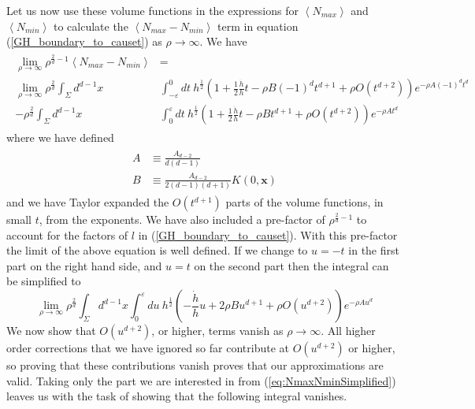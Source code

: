 \documentclass[12pt]{article}
\newcommand{\be}{\begin{equation}}
\newcommand{\ee}{\end{equation}}
\begin{document}
Let us now use these volume functions in the expressions for $\left\langle N_{max}\right\rangle$ and $\left\langle N_{min}\right\rangle$ to calculate the $\left\langle N_{max}-N_{min}\right\rangle$ term in equation (\ref{GH_boundary_to_causet}) as $\rho \rightarrow \infty$. We have
\begin{gather}\label{eq:NmaxNminStart}
\begin{aligned}
\lim_{\rho \to \infty}\rho^{\frac{2}{d}-1}\left\langle N_{max}-N_{min} \right\rangle &= \\
\lim_{\rho \to \infty}\rho^{\frac{2}{d}}
\int_{\Sigma}d^{d-1}x & \int_{-\varepsilon}^{0}dt\
h^{\frac{1}{2}}\left(1+
\frac{1}{2}\frac{\dot{h}}{h}t-\rho B(-1)^{d}t^{d+1}+\rho O(t^{d+2})\right)e^{-\rho A(-1)^{d}t^{d}} \\
-\rho^{\frac{2}{d}}\int_{\Sigma}d^{d-1}x &
\int_{0}^{\varepsilon}dt\
h^{\frac{1}{2}}\left(1+
\frac{1}{2}\frac{\dot{h}}{h}t-\rho Bt^{d+1}+\rho O(t^{d+2})\right)e^{-\rho At^{d}}
\end{aligned}
\end{gather}
where we have defined
\begin{gather}\label{A_and_B_defn}
\begin{aligned}
A & \equiv \frac{A_{d-2}}{d(d-1)} \\
B & \equiv \frac{A_{d-2}}{2(d-1)(d+1)}K(0,\mathbf{x})
\end{aligned}
\end{gather}
and we have Taylor expanded the $O(t^{d+1})$ parts of the volume functions, in small $t$, from the exponents. We have also included a pre-factor of $\rho^{\frac{2}{d}-1}$ to account for the factors of $l$ in (\ref{GH_boundary_to_causet}). With this pre-factor the limit of the above equation is well defined. If we change to $u=-t$ in the first part on the right hand side, and $u=t$ on the second part then the integral can be simplified to
\be\label{eq:NmaxNminSimplified}
\lim_{\rho \to \infty}\rho^{\frac{2}{d}}
\int_{\Sigma}d^{d-1}x \int_{0}^{\varepsilon}du\
h^{\frac{1}{2}}\left(-\frac{\dot{h}}{h}u+2\rho B u^{d+1}+\rho O(u^{d+2}) \right)e^{-\rho Au^{d}}
\ee
We now show that $O(u^{d+2})$, or higher, terms vanish as $\rho \rightarrow\infty$. All higher order corrections that we have ignored so far contribute at $O(u^{d+2})$ or higher, so proving that these contributions vanish proves that our approximations are valid. Taking only the part we are interested in from (\ref{eq:NmaxNminSimplified}) leaves us with the task of showing that the following integral vanishes.
\end{document}
